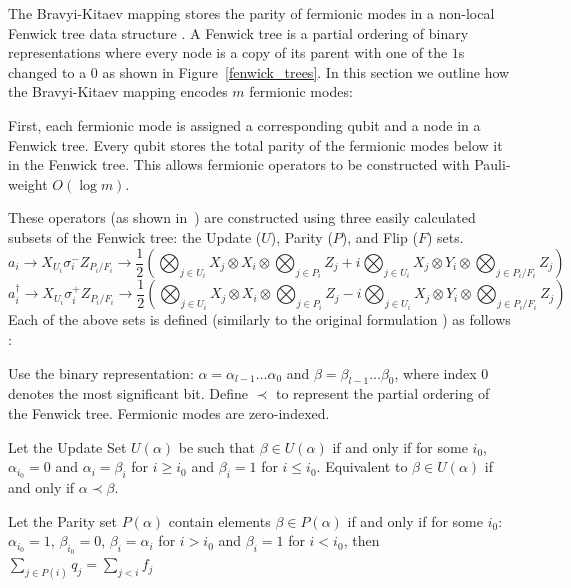 The Bravyi-Kitaev mapping stores the parity of fermionic modes in a non-local Fenwick tree data structure \cite{havlivcek2017operator}. A Fenwick tree \cite{fenwick1994new} is a partial ordering of binary representations where every node is a copy of its parent with one of the $1$s changed to a $0$ as shown in Figure~\ref{fenwick_trees}. In this section we outline how the Bravyi-Kitaev mapping encodes $m$ fermionic modes:

First, each fermionic mode is assigned a corresponding qubit and a node in a Fenwick tree. Every qubit stores the total parity of the fermionic modes below it in the Fenwick tree. This allows fermionic operators to be constructed with Pauli-weight $O(\log m)$.

These operators (as shown in~\cite{seeley2012bravyi}) are constructed using three easily calculated subsets of the Fenwick tree: the Update ($U$), Parity ($P$), and Flip ($F$)  sets.
\begin{dmath*}
a_i \rightarrow X_{U_i}  \sigma^-_i  Z_{ P_i/F_i} \rightarrow \frac{1}{2}\left( \bigotimes_{j \in U_i} X_j \otimes X_i \otimes \bigotimes_{j \in P_i} Z_j + i \bigotimes_{j \in U_i} X_j \otimes Y_i\otimes \bigotimes_{j \in P_i/F_i} Z_j \right)
\end{dmath*}
\begin{dmath*}
a^{\dagger}_i \rightarrow X_{U_i}  \sigma^+_iZ_{ P_i/F_i} \rightarrow \frac{1}{2}\left( \bigotimes_{j \in U_i} X_j \otimes X_i \otimes \bigotimes_{j \in P_i} Z_j - i \bigotimes_{j \in U_i} X_j \otimes Y_i\otimes \bigotimes_{j \in  P_i/F_i} Z_j \right) 
\end{dmath*}
Each of the above sets is defined (similarly to the original formulation \cite{seeley2012bravyi}) as follows :

Use the binary representation: $\alpha = \alpha_{l-1}\ldots \alpha_0$ and $\beta = \beta_{l-1}\ldots \beta_0$, where index $0$ denotes the most significant bit. Define $\prec$ to represent the partial ordering of the Fenwick tree. Fermionic modes are zero-indexed.

\begin{definition} Let the Update Set $U(\alpha)$ be such that $\beta \in U(\alpha)$ if and only if for some $i_0$, $\alpha_{i_0} = 0$ and $\alpha_i = \beta_i$ for $i\geq i_0$ and $\beta_i = 1$ for $i \leq i_0$. Equivalent to $\beta \in U(\alpha)$ if and only if $\alpha \prec \beta$.
\end{definition}

\begin{definition} Let the Parity set $P(\alpha)$ contain elements $\beta \in P(\alpha)$ if and only if for some $i_0$: $\alpha_{i_0} = 1$, $\beta_{i_0} = 0$, $\beta_i = \alpha_i$ for $i> i_0$ and $\beta_i = 1$ for $i< i_0$, then $
        \sum_{j \in P(i)} q_j = \sum_{j < i} f_j$
\end{definition}

